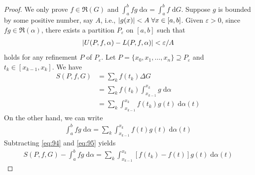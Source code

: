 \documentclass[thmcnt=section, 12pt]{my-elegantbook}
\begin{document}
\begin{proof}
    We only prove $f \in \mathfrak{R}(G)$ and $\int_{a}^{b} f g \; \mathrm{d}\alpha = \int_{a}^{b} f \; \mathrm{d}G$. Suppose $g$ is bounded by some positive number, say $A$, i.e., $\left\lvert g(x) \right\rvert < A \; \forall x \in [a, b]$. Given $\varepsilon > 0$, since $f g \in \mathfrak{R}(\alpha)$, there exists a partition $P_\varepsilon$ on $[a, b]$ such that 
    \begin{align}
        \left\lvert U(P,f,\alpha) - L(P,f,\alpha) \right\rvert < \varepsilon / A
        \label{eq:96}
    \end{align}
    holds for any refinement $P$ of $P_\varepsilon$. Let $P = \{x_0, x_1, \ldots, x_n\} \supseteq P_\varepsilon$ and $t_k \in [x_{k-1}, x_k]$. We have
    \begin{align}
        S(P,f, G) 
        &= \sum_k f(t_k) \Delta G \nonumber \\
        &= \sum_k f(t_k) \int_{x_{k-1}}^{x_k} g \; \mathrm{d}\alpha \nonumber \\ 
        &= \sum_k \int_{x_{k-1}}^{x_k} f(t_k) g(t) \; \mathrm{d}\alpha(t)
        \label{eq:94}
    \end{align}
    On the other hand, we can write
    \begin{align}
        \int_{a}^{b} f g  \; \mathrm{d}\alpha
        = \sum_k \int_{x_{k-1}}^{x_k} f(t) g(t) \; \mathrm{d}\alpha(t)
        \label{eq:95}
    \end{align}
    Subtracting \eqref{eq:94} and \eqref{eq:95} yields
    \begin{align*}
        S(P,f, G) - \int_{a}^{b} f g  \; \mathrm{d}\alpha
        = \sum_k \int_{x_{k-1}}^{x_k} [f(t_k) - f(t)] g(t) \; \mathrm{d}\alpha(t)
    \end{align*}
    

\end{proof}
\end{document}

